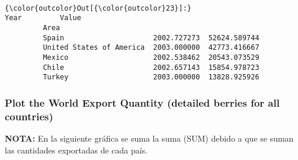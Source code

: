 \documentclass[11pt]{article}
\begin{document}
    \begin{center}
    \end{center}
    { \hspace*{\fill} \\}
    
\begin{Verbatim}[commandchars=\\\{\}]
{\color{outcolor}Out[{\color{outcolor}23}]:}                                  Year         Value
         Area                                               
         Spain                     2002.727273  52624.589744
         United States of America  2003.000000  42773.416667
         Mexico                    2002.538462  20543.073529
         Chile                     2002.657143  15854.978723
         Turkey                    2003.000000  13828.925926
\end{Verbatim}
            
    \subsubsection{Plot the World Export Quantity (detailed berries for all
countries)}\label{plot-the-world-export-quantity-detailed-berries-for-all-countries}

    \textbf{NOTA:} En la siguiente gráfica se suma la suma (SUM) debido a
que se suman las cantidades exportadas de cada país.
\end{document}

